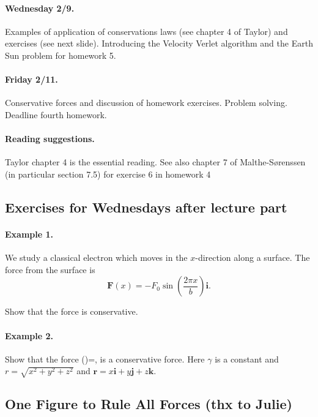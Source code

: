 \documentclass[%
oneside,                 %
final,                   %
10pt]{article}
\begin{document}
\paragraph{Wednesday 2/9.}
Examples of application of conservations laws (see chapter 4 of Taylor) and exercises (see next slide).
Introducing the Velocity Verlet algorithm and the Earth Sun problem for homework 5.

\paragraph{Friday 2/11.}
Conservative forces and discussion of homework exercises. Problem solving. Deadline fourth homework.


\paragraph{Reading suggestions.}
Taylor chapter 4 is the essential reading.
See also chapter 7 of Malthe-Sørenssen (in particular section 7.5) for exercise 6 in homework 4



\subsection*{Exercises for Wednesdays after lecture part}


\paragraph{Example 1.}
We study a classical electron which moves in the $x$-direction along a surface. The force from the surface is
\[
\bm{F}(x)=-F_0\sin{(\frac{2\pi x}{b})}\bm{i}.
\]

Show that the force is conservative.




\paragraph{Example 2.}
Show that the force
()=\gamma {},
is a conservative force. Here $\gamma$ is a constant and $r=\sqrt{x^2+y^2+z^2}$ and $\bm{r}=x\bm{i}+y\bm{j}+z\bm{k}$.



\subsection*{One Figure to Rule All Forces (thx to Julie)}
\end{document}
